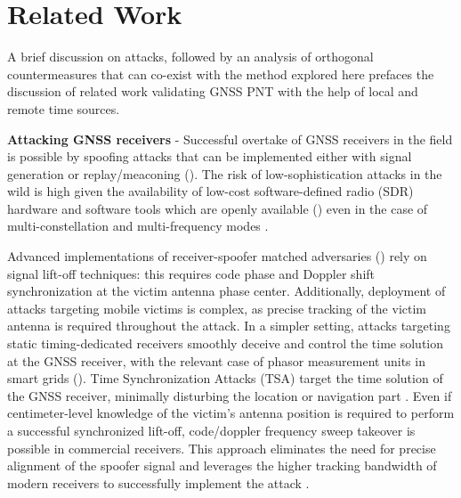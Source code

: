 \section{Related Work}
\label{section:background}

A brief discussion on attacks, followed by an analysis of orthogonal countermeasures that can co-exist with the method explored here prefaces the discussion of related work validating GNSS PNT with the help of local and remote time sources. 

\textbf{Attacking GNSS receivers} - Successful overtake of GNSS receivers in the field is possible by spoofing attacks that can be implemented either with signal generation or replay/meaconing (\cite{tippenhauer2011requirements, Kerns2014, Bhatti2017, Ioannides2016}). The risk of low-sophistication attacks in the wild is high given the availability of low-cost software-defined radio (SDR) hardware and software tools which are openly available (\cite{KexiongAllBelongToUs2018, Feng2021, HuangL2015}) even in the case of multi-constellation \cite{LeksellTGalileo2021} and multi-frequency modes \cite{SDRMultiFrequency2018}.

Advanced implementations of receiver-spoofer matched adversaries (\cite{HumphreysAssessingSpoofer, Maier2018}) rely on signal lift-off techniques: this requires code phase and Doppler shift synchronization at the victim antenna phase center. Additionally, deployment of attacks targeting mobile victims is complex, as precise tracking of the victim antenna is required throughout the attack. In a simpler setting, attacks targeting static timing-dedicated receivers smoothly deceive and control the time solution at the GNSS receiver, with the relevant case of phasor measurement units in smart grids (\cite{Shepard2012c, Humphreys2012, Jiang2013, Zhu2016}). Time Synchronization Attacks (TSA) target the time solution of the GNSS receiver, minimally disturbing the location or navigation part \cite{Zhang2013}. Even if centimeter-level knowledge of the victim's antenna position is required to perform a successful synchronized lift-off, code/doppler frequency sweep takeover is possible in commercial receivers. This approach eliminates the need for precise alignment of the spoofer signal and leverages the higher tracking bandwidth of modern receivers to successfully implement the attack \cite{Jiadong2019}.



